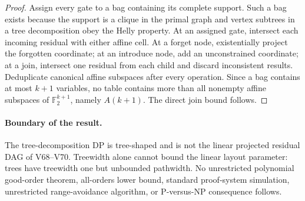 \documentclass[11pt]{article}
\begin{document}
\begin{proof}
Assign every gate to a bag containing its complete support.  Such a bag exists because the support is a clique in the primal graph and vertex subtrees in a tree decomposition obey the Helly property.  At an assigned gate, intersect each incoming residual with either affine cell.  At a forget node, existentially project the forgotten coordinate; at an introduce node, add an unconstrained coordinate; at a join, intersect one residual from each child and discard inconsistent results.  Deduplicate canonical affine subspaces after every operation.  Since a bag contains at most $k+1$ variables, no table contains more than all nonempty affine subspaces of $\mathbb F_2^{k+1}$, namely $A(k+1)$.  The direct join bound follows.
\end{proof}

\paragraph{Boundary of the result.}
The tree-decomposition DP is tree-shaped and is not the linear projected residual DAG of V68--V70.  Treewidth alone cannot bound the linear layout parameter: trees have treewidth one but unbounded pathwidth.  No unrestricted polynomial good-order theorem, all-orders lower bound, standard proof-system simulation, unrestricted range-avoidance algorithm, or P-versus-NP consequence follows.
\end{document}
